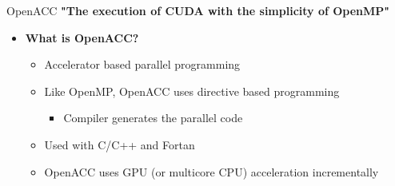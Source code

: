 \documentclass[aspectratio=169]{beamer}
\begin{document}
\begin{frame}[fragile]{OpenACC}
\centering\textbf{"The execution of CUDA with the simplicity of OpenMP"}\bigskip

\begin{itemize}
\item \textbf{What is OpenACC?}
	\begin{itemize}
	\item Accelerator based parallel programming
    \item Like OpenMP, OpenACC uses directive based programming
    \begin{itemize}
    \item Compiler generates the parallel code
    \end{itemize}
	\item Used with C/C++ and Fortan
    \item OpenACC uses GPU (or multicore CPU) acceleration incrementally
	\end{itemize}
\end{itemize}


\end{frame}
\end{document}
